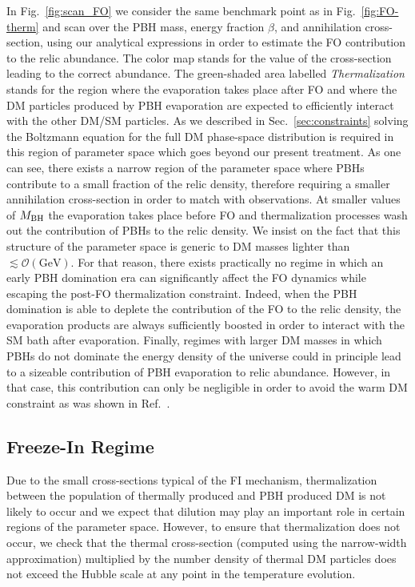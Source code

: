 \documentclass[aps,prd,reprint,twocolumn,preprintnumbers,floatfix,nofootinbib]{revtex4-1}
\newcommand{\MBH}{M_{\rm BH}}
\begin{document}
In Fig.~\ref{fig:scan_FO} we consider the same benchmark point as in Fig.~\ref{fig:FO-therm} and scan over the PBH mass, energy fraction $\beta$, and annihilation cross-section, using our analytical expressions in order to estimate the FO contribution to the relic abundance. The color map stands for the value of the cross-section leading to the correct abundance. The green-shaded area labelled {\em Thermalization} stands for the region where the evaporation takes place after FO and where the DM particles produced 
by PBH evaporation are expected to efficiently interact with the other DM/SM particles. As we described in Sec.~\ref{sec:constraints}  solving the Boltzmann equation for the full DM phase-space distribution is required in this region of parameter space which goes beyond our present treatment. As one can see, there exists a narrow region of the parameter space where PBHs contribute to a small fraction of the relic density, therefore requiring a smaller annihilation cross-section in order to match with observations. At smaller values of $\MBH$ the evaporation takes place before FO and thermalization processes wash out the contribution of PBHs to the relic density. We insist on the fact that this structure of the parameter space is generic to DM masses lighter than $\lesssim \mathcal{O}(\mathrm{GeV})$. For that reason, there exists practically no regime in which an early PBH domination era can significantly affect the FO dynamics while escaping the post-FO thermalization constraint. Indeed, when the PBH domination is able to deplete the contribution of the FO to the relic density, the evaporation products are always sufficiently boosted in order to interact with the SM bath after evaporation. Finally, regimes with larger DM masses in which PBHs do not dominate the energy density of the universe could in principle lead to a sizeable contribution of PBH evaporation to relic abundance. However, in that case, this contribution can only be negligible in order to avoid the warm DM constraint as was shown in Ref.~\cite{Masina:2020xhk, Masina:2021zpu}.


\subsection{Freeze-In Regime}\label{sec:FI}


Due to the small cross-sections typical of the FI mechanism, thermalization between the population of thermally produced and PBH produced DM is not likely to occur and we expect that dilution may play an important role in certain regions of the parameter space. However, to ensure that thermalization does
not occur, we check that the thermal cross-section (computed using the narrow-width approximation) multiplied by the number density of thermal DM particles does not exceed the Hubble scale at any point in the temperature evolution. 
\end{document}
